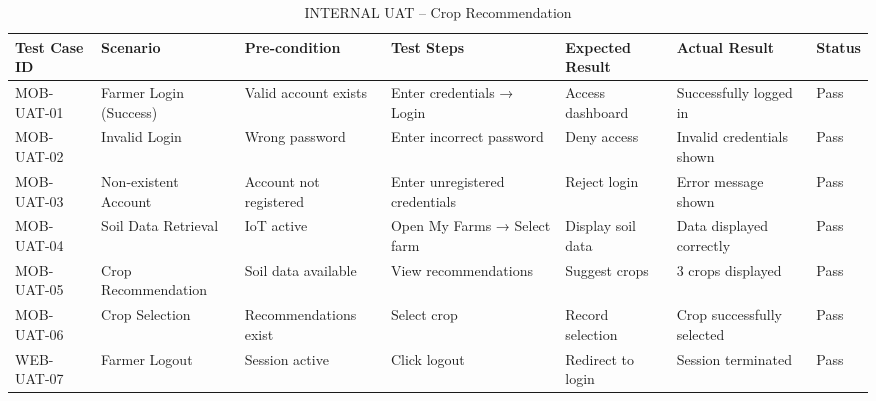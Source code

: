 {	\begin{table}[H]
		\centering
		\caption{INTERNAL UAT – Crop Recommendation}
		\renewcommand{\arraystretch}{1.2}
		\begin{adjustbox}{max width=\textwidth}
			\begin{tabular}{p{2cm}p{3cm}p{3cm}p{3cm}p{4cm}p{4cm}p{1.5cm}}
				\toprule
				\textbf{Test Case ID} & \textbf{Scenario} & \textbf{Pre-condition} & \textbf{Test Steps} & \textbf{Expected Result} & \textbf{Actual Result} & \textbf{Status} \\
				\midrule
				MOB-UAT-01 & Farmer Login (Success) & Valid account exists & Enter credentials → Login & Access dashboard & Successfully logged in & Pass \\
				MOB-UAT-02 & Invalid Login & Wrong password & Enter incorrect password & Deny access & Invalid credentials shown & Pass \\
				MOB-UAT-03 & Non-existent Account & Account not registered & Enter unregistered credentials & Reject login & Error message shown & Pass \\
				MOB-UAT-04 & Soil Data Retrieval & IoT active & Open My Farms → Select farm & Display soil data & Data displayed correctly & Pass \\
				MOB-UAT-05 & Crop Recommendation & Soil data available & View recommendations & Suggest crops & 3 crops displayed & Pass \\
				MOB-UAT-06 & Crop Selection & Recommendations exist & Select crop & Record selection & Crop successfully selected & Pass \\
				WEB-UAT-07 & Farmer Logout & Session active & Click logout & Redirect to login & Session terminated & Pass \\
				\bottomrule
			\end{tabular}
		\end{adjustbox}
	\end{table}
	
}
